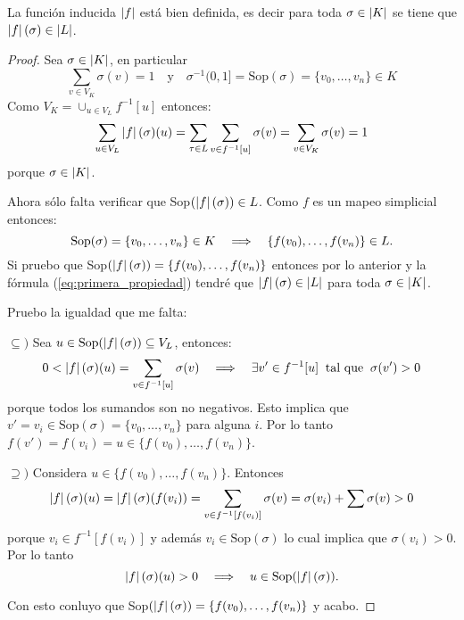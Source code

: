 \begin{ejercicio}\label{ej:54}
  La funci\'on inducida $\left| f \right|$ est\'a bien definida, es decir para toda $\sigma\in\left| K \right|$ se tiene que
  $\left| f \right|(\sigma)\in\left| L \right|$.
\end{ejercicio}
\begin{proof}%
	Sea $\sigma\in\left| K \right|$, en particular
	\[
		\sum_{v\in V_K}\sigma(v)=1 \quad\text{y}\quad \sigma^{-1}(0,1]=\text{Sop}(\sigma)=\{v_0,\ldots,v_n\}\in K
	\]
	Como $V_K=\cup_{u\in V_L}f^{-1}[u]$ entonces:
	\begin{equation}\label{eq:primera_propiedad}
		\sum_{u\in V_L}\left| f \right|(\sigma)(u)=\sum_{\tau\in L} \sum_{v\in f^{-1}[u]}\sigma(v)=\sum_{v\in V_K}\sigma(v)=1
	\end{equation}
	porque $\sigma\in\left| K \right|$.

	Ahora s\'olo falta verificar que Sop$(\left| f \right|(\sigma))\in L$. Como $f$ es un mapeo simplicial entonces:
	\[
		\text{Sop}(\sigma)=\{v_0,\ldots,v_n\}\in K \quad\Longrightarrow\quad \{f(v_0),\ldots,f(v_n)\}\in L.
	\]
	Si pruebo que Sop$(\left| f \right|(\sigma))=\{f(v_0),\ldots,f(v_n)\}$ entonces por lo anterior y la f\'ormula
	(\ref{eq:primera_propiedad}) tendr\'e que $\left| f \right|(\sigma)\in\left| L \right|$ para toda $\sigma\in\left| K \right|$.

	Pruebo la igualdad que me falta:

	$\subseteq)$ Sea $u\in\text{Sop}(\left| f \right|(\sigma))\subseteq V_L$, entonces:
	\[
		0<\left| f \right|(\sigma)(u)=\sum_{v\in f^{-1}[u]}\sigma(v) \quad\Longrightarrow\quad \exists
		v'\in f^{-1}[u] \;\;\text{tal que}\;\; \sigma(v')>0
	\]
	porque todos los sumandos son no negativos. Esto implica que $v'=v_i\in\text{Sop}(\sigma)=\{v_0,\ldots,v_n\}$
	para alguna $i$. Por lo tanto $f(v')=f(v_i)=u\in\{f(v_0),\ldots,f(v_n)\}$.

	$\supseteq)$ Considera $u\in\{f(v_0),\ldots,f(v_n)\}$. Entonces
	\[
		\left| f \right|(\sigma)(u)=\left| f \right|(\sigma)(f(v_i))=\sum_{v\in f^{-1}[f(v_i)]}\sigma(v)=\sigma(v_i)+\sum \sigma(v)>0
	\]
	porque $v_i\in f^{-1}[f(v_i)]$ y adem\'as $v_i\in\text{Sop}(\sigma)$ lo cual implica que $\sigma(v_i)>0$.
	Por lo tanto
	\[
		\left| f \right|(\sigma)(u)>0 \quad\Longrightarrow\quad u\in\text{Sop}(\left| f \right|(\sigma)). 
	\]
	
	Con esto conluyo que Sop$(\left| f \right|(\sigma))=\{f(v_0),\ldots,f(v_n)\}$ y acabo.
\end{proof}%

